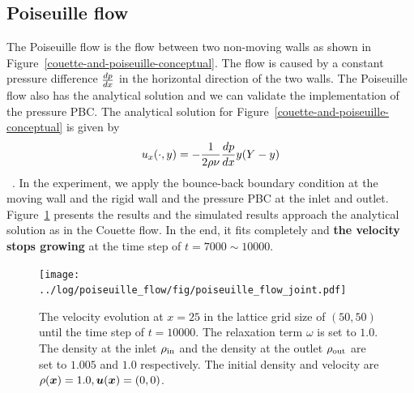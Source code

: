 \subsection{Poiseuille flow}
The Poiseuille flow is the flow between two non-moving walls as shown in Figure~\ref{couette-and-poiseuille-conceptual}.
The flow is caused by a constant pressure difference $\frac{d p}{d x}$
in the horizontal direction of the two walls.
The Poiseuille flow also has the analytical solution
and we can validate the implementation of the pressure PBC.
The analytical solution for Figure~\ref{couette-and-poiseuille-conceptual} is given by
\begin{equation}
\begin{aligned}
  u_x(\cdot, y) = - \frac{1}{2\rho \nu} \frac{d p}{d x} y (Y - y)
\end{aligned}
\end{equation}
~\cite{mendiburu2009analytical}.
In the experiment, we apply the bounce-back boundary condition
at the moving wall and the rigid wall
and the pressure PBC at the inlet and outlet.
Figure~\ref{fig:poiseuille-velocity-evolution} presents the results
and the simulated results approach the analytical solution as in the Couette flow.
In the end, it fits completely
and {\bf the velocity stops growing} at the time step of $t = 7000 \sim 10000$.

\begin{figure}[H]
  \vspace{-3mm}
  \centering
  \texttt{[image: ../log/poiseuille\_flow/fig/poiseuille\_flow\_joint.pdf]}
  \vspace{-3mm}
  \caption{The velocity evolution at
  $x = 25$ in the lattice grid size of $(50, 50)$ until the time step of $t = 10000$.
  The relaxation term $\omega$ is set to $1.0$.
  The density at the inlet $\rho_{\rm in}$ and the density
  at the outlet $\rho_{\rm out}$ are set to $1.005$ and $1.0$ respectively.
  The initial density and velocity are $\rho(\boldsymbol{x}) = 1.0, \boldsymbol{u}(\boldsymbol{x}) = (0, 0)$.
  \label{fig:poiseuille-velocity-evolution}}
\end{figure}

